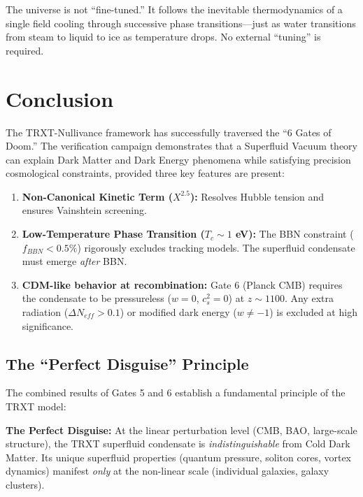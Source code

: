 \documentclass[a4paper,12pt]{article}
\begin{document}
The universe is not ``fine-tuned.'' It follows the inevitable thermodynamics of a single field cooling through successive phase transitions---just as water transitions from steam to liquid to ice as temperature drops. No external ``tuning'' is required.

\section{Conclusion}

The TRXT-Nullivance framework has successfully traversed the ``6 Gates of Doom.'' The verification campaign demonstrates that a Superfluid Vacuum theory can explain Dark Matter and Dark Energy phenomena while satisfying precision cosmological constraints, provided three key features are present:

\begin{enumerate}
    \item \textbf{Non-Canonical Kinetic Term ($X^{2.5}$):} Resolves Hubble tension and ensures Vainshtein screening.
    \item \textbf{Low-Temperature Phase Transition ($T_c \sim 1$ eV):} The BBN constraint ($f_{BBN} < 0.5\%$) rigorously excludes tracking models. The superfluid condensate must emerge \textit{after} BBN.
    \item \textbf{CDM-like behavior at recombination:} Gate 6 (Planck CMB) requires the condensate to be pressureless ($w = 0$, $c_s^2 = 0$) at $z \sim 1100$. Any extra radiation ($\Delta N_{eff} > 0.1$) or modified dark energy ($w \neq -1$) is excluded at high significance.
\end{enumerate}

\subsection{The ``Perfect Disguise'' Principle}
The combined results of Gates 5 and 6 establish a fundamental principle of the TRXT model:

\begin{mdframed}[backgroundcolor=blue!5]
\textbf{The Perfect Disguise:} At the linear perturbation level (CMB, BAO, large-scale structure), the TRXT superfluid condensate is \textit{indistinguishable} from Cold Dark Matter. Its unique superfluid properties (quantum pressure, soliton cores, vortex dynamics) manifest \textit{only} at the non-linear scale (individual galaxies, galaxy clusters).
\end{mdframed}
\end{document}
